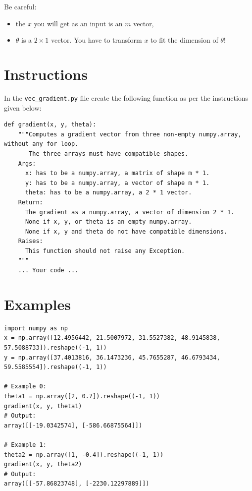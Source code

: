 \documentclass{42-en}
\begin{document}
Be careful:
\begin{itemize}
  \item the $x$ you will get as an input is an $m$ vector,
  \item $\theta$ is a $2 \times 1$ vector. You have to transform $x$ to fit the dimension of $\theta$!
\end{itemize}

\section*{Instructions}
In the \texttt{vec\_gradient.py} file create the following function as per the instructions given below:
\par
\begin{verbatim}
def gradient(x, y, theta):
    """Computes a gradient vector from three non-empty numpy.array, without any for loop.
       The three arrays must have compatible shapes.
    Args:
      x: has to be a numpy.array, a matrix of shape m * 1.
      y: has to be a numpy.array, a vector of shape m * 1.
      theta: has to be a numpy.array, a 2 * 1 vector.
    Return:
      The gradient as a numpy.array, a vector of dimension 2 * 1.
      None if x, y, or theta is an empty numpy.array.
      None if x, y and theta do not have compatible dimensions.
    Raises:
      This function should not raise any Exception.
    """
    ... Your code ...
\end{verbatim}

\section*{Examples}

\begin{verbatim}
import numpy as np
x = np.array([12.4956442, 21.5007972, 31.5527382, 48.9145838, 57.5088733]).reshape((-1, 1))
y = np.array([37.4013816, 36.1473236, 45.7655287, 46.6793434, 59.5585554]).reshape((-1, 1))

# Example 0:
theta1 = np.array([2, 0.7]).reshape((-1, 1))
gradient(x, y, theta1)
# Output:
array([[-19.0342574], [-586.66875564]])

# Example 1:
theta2 = np.array([1, -0.4]).reshape((-1, 1))
gradient(x, y, theta2)
# Output:
array([[-57.86823748], [-2230.12297889]])
\end{verbatim}
\end{document}
